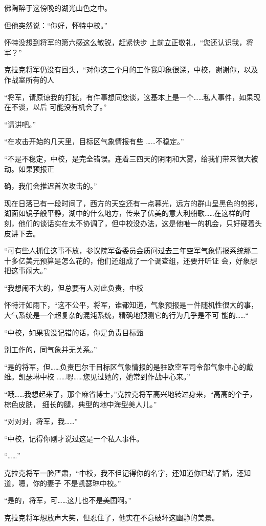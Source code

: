\documentclass{article}
\begin{document}
\newpage
佛陶醉于这傍晚的湖光山色之中。 


但他突然说：“你好，怀特中校。” 

怀特没想到将军的第六感这么敏锐，赶紧快步
上前立正敬礼，“您还认识我，将军？” 

克拉克将军仍没有回头，“对你这三个月的工作我印象很深，中校，谢谢你，以及作战室所有的人

“将军，请原谅我的打扰，有件事想同您谈，这基本上是一个……私人事件，如果现在不谈，以后
可能没有机会了。” 


“请讲吧。” 

“在攻击开始的几天里，目标区气象情报有些
……不稳定。” 

“不是不稳定，中校，是完全错误。连着三四天的阴雨和大雾，给我们带来很大被动。如果预报正

\newpage
确，我们会推迟首次攻击的。” 

现在日落已有一段时间了，西方的天空还有一点暮光，远方的群山呈黑色的剪影，湖面如镜子般平静，湖中的什么地方，传来了优美的意大利船歌……在这样的时刻，他们的谈话实在太不协调了，但中校没办法，这是他唯一的机会，只好硬着头皮讲下去。

“可有些人抓住这事不放，参议院军备委员会质问过去三年空军气象情报系统那二十多亿美元预算是怎么花的，他们还组成了一个调查组，还要开听证
会，好象想把这事闹大。” 

“我想闹不大的，但总要有人对此负责，中校

怀特汗如雨下，“这不公平，将军，谁都知道，气象预报是一件随机性很大的事，大气系统是一个超复杂的混沌系统，精确地预测它的行为几乎是不可
能的……“ 

“中校，如果我没记错的话，你是负责目标甄

\newpage
别工作的，同气象并无关系。” 

“是的将军，但……负责巴尔干目标区气象情报的是驻欧空军司令部气象中心的戴维。凯瑟琳中校
……嗯……您见过她的，她常到作战中心来。” 

“哦……我想起来了，那个麻省博士，”克拉克将军高兴地转过身来，“高高的个子，棕色皮肤，
细长的腿，典型的地中海型美人儿。” 


“对对对，将军，我……” 

“中校，记得你刚才说过这是一个私人事件。


“……” 

克拉克将军一脸严肃，“中校，我不但记得你的名字，还知道你已结了婚，还知道，嗯，你的妻子
不是凯瑟琳中校。” 

“是的，将军，可……这儿也不是美国啊。”

\newpage

克拉克将军想放声大笑，但忍住了，他实在不意破坏这幽静的美景。
\end{document}
